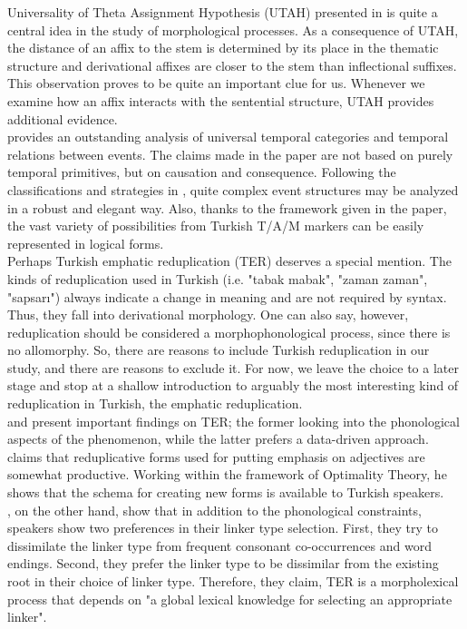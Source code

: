 \documentclass[11pt]{article} %
\begin{document}
Universality of Theta Assignment Hypothesis (UTAH) presented in \citet{Baker1988} is quite a central idea in the study of morphological processes. As a consequence of UTAH, the distance of an affix to the stem is determined by its place in the thematic structure and derivational affixes are closer to the stem than inflectional suffixes. This observation proves to be quite an important clue for us. Whenever we examine how an affix interacts with the sentential structure, UTAH provides additional evidence. \\ 

\citet{MoensSteedman1988} provides an outstanding analysis of universal temporal categories and temporal relations between events. The claims made in the paper are not based on purely temporal primitives, but on causation and consequence. Following the classifications and strategies in \citet{MoensSteedman1988}, quite complex event structures may be analyzed in a robust and elegant way. Also, thanks to the framework given in the paper, the vast variety of possibilities from Turkish T/A/M markers can be easily represented in logical forms. \\ 

Perhaps Turkish emphatic reduplication (TER) deserves a special mention. The kinds of reduplication used in Turkish (i.e. "tabak mabak", "zaman zaman", "sapsarı") always indicate a change in meaning and are not required by syntax. Thus, they fall into derivational morphology. One can also say, however, reduplication should be considered a morphophonological process, since there is no allomorphy. So, there are reasons to include Turkish reduplication in our study, and there are reasons to exclude it. For now, we leave the choice to a later stage and stop at a shallow introduction to arguably the most interesting kind of reduplication in Turkish, the emphatic reduplication. \\

\citet{Wedel1999} and \citet{KilicBozsahin2013} present important findings on TER; the former looking into the phonological aspects of the phenomenon, while the latter prefers a data-driven approach. \citet{Wedel1999} claims that reduplicative forms used for putting emphasis on adjectives are somewhat productive. Working within the framework of Optimality Theory, he shows that the schema for creating new forms is available to Turkish speakers. \\

\citet{KilicBozsahin2013}, on the other hand, show that in addition to the phonological constraints, speakers show two preferences in their linker type selection. First, they try to dissimilate the linker type from frequent consonant co-occurrences and word endings. Second, they prefer the linker type to be dissimilar from the existing root in their choice of linker type. Therefore, they claim, TER is a morpholexical process that depends on "a global lexical knowledge for selecting an appropriate linker".
\end{document}
